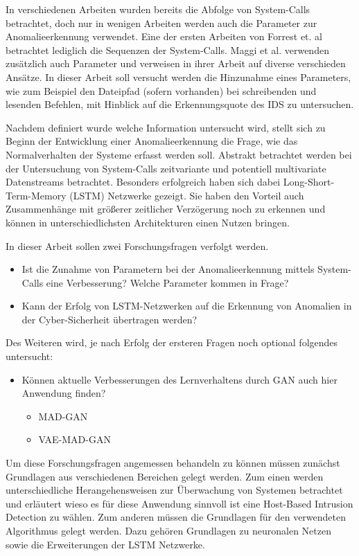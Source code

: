 In verschiedenen Arbeiten wurden bereits die Abfolge von System-Calls betrachtet, doch nur in wenigen Arbeiten werden auch die Parameter zur Anomalieerkennung verwendet. Eine der ersten Arbeiten von Forrest et. al \cite{FORREST} betrachtet lediglich die Sequenzen der System-Calls. Maggi et al. verwenden zusätzlich auch Parameter und verweisen in ihrer Arbeit \cite{MAGGI} auf diverse verschieden Ansätze.
In dieser Arbeit soll versucht werden die Hinzunahme eines Parameters, wie zum Beispiel den Dateipfad (sofern vorhanden) bei schreibenden und lesenden Befehlen, mit Hinblick auf die Erkennungsquote des IDS zu untersuchen.

Nachdem definiert wurde welche Information untersucht wird, stellt sich zu Beginn der Entwicklung einer Anomalieerkennung die Frage, wie das Normalverhalten der Systeme erfasst werden soll.
Abstrakt betrachtet werden bei der Untersuchung von System-Calls zeitvariante und potentiell multivariate Datenstreams betrachtet.
Besonders erfolgreich haben sich dabei Long-Short-Term-Memory (LSTM) Netzwerke gezeigt. Sie haben den Vorteil auch Zusammenhänge mit größerer zeitlicher Verzögerung noch zu erkennen \cite{HOCHREITER} und können in unterschiedlichsten Architekturen einen Nutzen bringen. %

In dieser Arbeit sollen zwei Forschungsfragen verfolgt werden.
\begin{itemize}
    \item Ist die Zunahme von Parametern bei der Anomalieerkennung mittels System-Calls eine Verbesserung?
        \subitem Welche Parameter kommen in Frage?
    \item Kann der Erfolg von LSTM-Netzwerken auf die Erkennung von Anomalien in der Cyber-Sicherheit übertragen werden?
\end{itemize}
Des Weiteren wird, je nach Erfolg der ersteren Fragen noch optional folgendes untersucht:
\begin{itemize}
    \item Können aktuelle Verbesserungen des Lernverhaltens durch GAN auch hier Anwendung finden?
    \begin{itemize}
        \item MAD-GAN \cite{LI}
        \item VAE-MAD-GAN \cite{NIU}
    \end{itemize}
\end{itemize}

Um diese Forschungsfragen angemessen behandeln zu können müssen zunächst Grundlagen aus verschiedenen Bereichen gelegt werden.
Zum einen werden unterschiedliche Herangehensweisen zur Überwachung von Systemen betrachtet und erläutert wieso es für diese Anwendung sinnvoll ist eine Host-Based Intrusion Detection zu wählen.
Zum anderen müssen die Grundlagen für den verwendeten Algorithmus gelegt werden.
Dazu gehören Grundlagen zu neuronalen Netzen sowie die Erweiterungen der LSTM Netzwerke.

